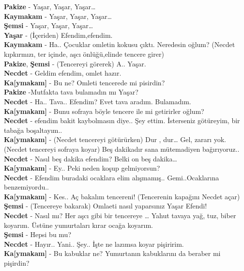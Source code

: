 \documentclass[]{book}
\begin{document}
\textbf{Pakize} - Yaşar, Yaşar, Yaşar\ldots{} ~\\
\textbf{Kaymakam} - Yaşar, Yaşar, Yaşar\ldots{}\\
\textbf{Şemsi} - Yaşar, Yaşar, Yaşar\ldots{}\\
\textbf{Yaşar} - (İçeriden) Efendim,efendim.\\
\textbf{Kaymakam} - Ha.. Çocuklar omletin kokusu çıktı. Neredesin oğlum?
(Necdet kıpkırmızı, ter içinde, aşcı önlüğü,elinde tencere girer)\\
\textbf{Pakize}, \textbf{Şemsi} - (Tencereyi görerek) A.. Yaşar.\\
\textbf{Necdet} - Geldim efendim, omlet hazır.\\
\textbf{Ka{[}ymakam{]}} - Bu ne? Omleti tencerede mi pisirdin?\\
\textbf{Pakize} -Mutfakta tava bulamadın mı Yaşar?\\
\textbf{Necdet} - Ha.. Tava.. Efendim? Evet tava aradım. Bulamadım.\\
\textbf{Ka{[}ymakam{]}} - Bunu sofraya böyle tencere ile mi getirirler oğlum?\\
\textbf{Necdet} - efendim bakit kaybolmasın diye.. Şey ettim. İsterseniz götüreyim, bir tabağa boşaltayım..\\
\textbf{Ka{[}ymakam{]}} - (Necdet tencereyi götürürken) Dur , dur\ldots{} Gel, zararı yok. (Necdet tencereyi sofraya koyar) Beş dakikadır sana mütemadiyen bağırıyoruz..\\
\textbf{Necdet} - Nasıl beş dakika efendim? Belki on beş dakika\ldots{}\\
\textbf{Ka{[}ymakam{]}} - Ey.. Peki neden koşup gelmiyorsun?\\
\textbf{Necdet} - Efendim buradaki ocaklara elim alışmamış.. Gemi..Ocaklarına benzemiyordu..\\
\textbf{Ka{[}ymakam{]}} - Kes.. Aç bakalım tencereni! (Tencerenin kapağını Necdet açar)\\
\textbf{Şemsi} - (Tencereye bakarak) Omlaeti nasıl yaparsınız Yaşar Efendi!\\
\textbf{Necdet} - Nasıl mı? Her aşcı gibi bir tencereye \ldots{} Yahut tavaya yağ, tuz, biber koyarım. Üstüne yumurtaları kırar ocağa koyarım.\\
\textbf{Şemsi} - Hepsi bu mu?\\
\textbf{Necdet} - Hayır.. Yani.. Şey.. İşte ne lazımsa koyar pişiririm.\\
\textbf{Ka{[}ymakam{]}} - Bu kabuklar ne? Yumurtanın kabuklarını da beraber mi pişirdin?\\
\end{document}
